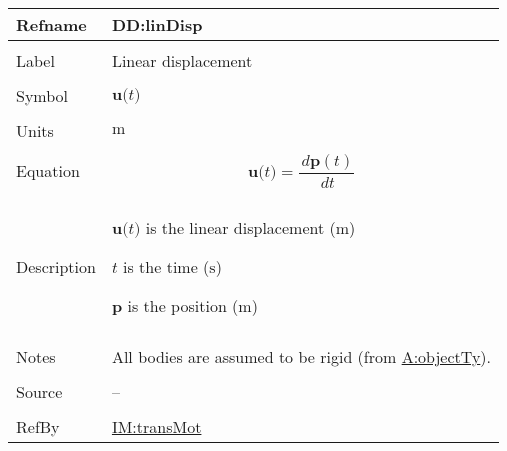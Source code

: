 \documentclass[12pt]{article}
\begin{document}
\vspace{\baselineskip}
\noindent
\begin{minipage}{\textwidth}
\begin{tabular}{>{\raggedright}p{}>{\raggedright\arraybackslash}p{}}
\toprule \textbf{Refname} & \textbf{DD:linDisp}
\label{DD:linDisp}
\\ \midrule \\
Label & Linear displacement
        
\\ \midrule \\
Symbol & $\symbf{u}\text{(}t\text{)}$
         
\\ \midrule \\
Units & ${\text{m}}$
        
\\ \midrule \\
Equation & \begin{displaymath}
           \symbf{u}\text{(}t\text{)}=\frac{\,d\symbf{p}\left(t\right)}{\,dt}
           \end{displaymath}
\\ \midrule \\
Description & \begin{symbDescription}
              \item{$\symbf{u}\text{(}t\text{)}$ is the linear displacement (${\text{m}}$)}
              \item{$t$ is the time (${\text{s}}$)}
              \item{$\symbf{p}$ is the position (${\text{m}}$)}
              \end{symbDescription}
\\ \midrule \\
Notes & All bodies are assumed to be rigid (from \hyperref[assumpOT]{A:objectTy}).
        
\\ \midrule \\
Source & --
         
\\ \midrule \\
RefBy & \hyperref[IM:transMot]{IM:transMot}
        
\\ \bottomrule
\end{tabular}
\end{minipage}
\end{document}
